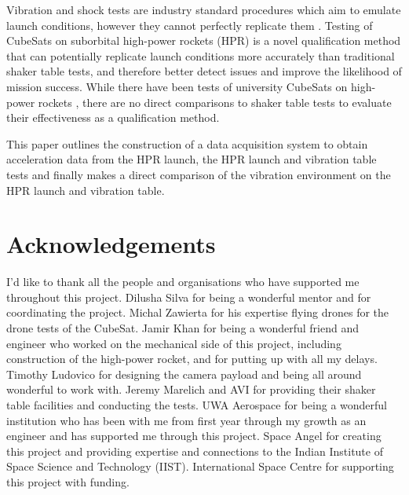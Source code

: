 \documentclass[a4paper,11pt]{article}
\begin{document}
Vibration and shock tests are industry standard procedures which aim to emulate launch conditions, however they cannot perfectly replicate them \cite{gordon2015benefits}. Testing of CubeSats on suborbital high-power rockets (HPR) is a novel qualification method that can potentially replicate launch conditions more accurately than traditional shaker table tests, and therefore better detect issues and improve the likelihood of mission success. While there have been tests of university CubeSats on high-power rockets \cite{slongo2019pre}, there are no direct comparisons to shaker table tests to evaluate their effectiveness as a qualification method.

This paper outlines the construction of a data acquisition system to obtain acceleration data from the HPR launch, the HPR launch and vibration table tests and finally makes a direct comparison of the vibration environment on the HPR launch and vibration table.


\section{Acknowledgements}

I'd like to thank all the people and organisations who have supported me throughout this project. Dilusha Silva for being a wonderful mentor and for coordinating the project. Michal Zawierta for his expertise flying drones for the drone tests of the CubeSat. Jamir Khan for being a wonderful friend and engineer who worked on the mechanical side of this project, including construction of the high-power rocket, and for putting up with all my delays. Timothy Ludovico for designing the camera payload and being all around wonderful to work with. Jeremy Marelich and AVI for providing their shaker table facilities and conducting the tests. UWA Aerospace for being a wonderful institution who has been with me from first year through my growth as an engineer and has supported me through this project. Space Angel for creating this project and providing expertise and connections to the Indian Institute of Space Science and Technology (IIST). International Space Centre for supporting this project with funding.


\newpage
\tableofcontents
\newpage


\end{document}
